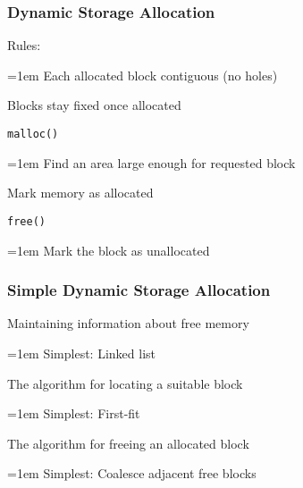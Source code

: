\documentclass{plt}
\begin{document}
\begin{frame}
  \frametitle{Dynamic Storage Allocation}

Rules:

{\parindent=1em
Each allocated block contiguous (no holes)

Blocks stay fixed once allocated
}

\texttt{malloc()}

{\parindent=1em
Find an area large enough for requested block

Mark memory as allocated
}

\texttt{free()}

{\parindent=1em
Mark the block as unallocated
}


\end{frame}


\begin{frame}
  \frametitle{Simple Dynamic Storage Allocation}

Maintaining information about free memory

{\parindent=1em
Simplest: Linked list
}

The algorithm for locating a suitable block

{\parindent=1em
Simplest: First-fit
}

The algorithm for freeing an allocated block

{\parindent=1em
Simplest: Coalesce adjacent free blocks
}

\end{frame}

\setlength{\unitbox}{1.3pc}
\end{document}
